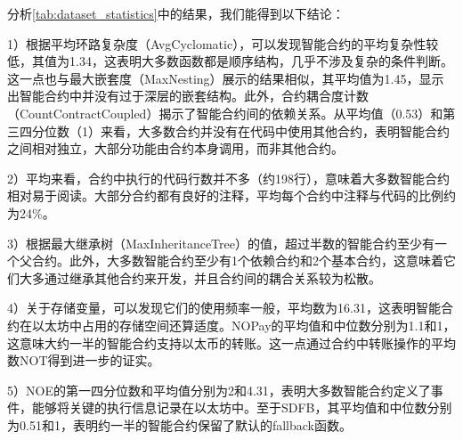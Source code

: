 分析\autoref{tab:dataset_statistics}中的结果，我们能得到以下结论：

1）根据平均环路复杂度（AvgCyclomatic），可以发现智能合约的平均复杂性较低，其值为1.34，这表明大多数函数都是顺序结构，几乎不涉及复杂的条件判断。这一点也与最大嵌套度（MaxNesting）展示的结果相似，其平均值为1.45，显示出智能合约中并没有过于深层的嵌套结构。此外，合约耦合度计数（CountContractCoupled）揭示了智能合约间的依赖关系。从平均值（0.53）和第三四分位数（1）来看，大多数合约并没有在代码中使用其他合约，表明智能合约之间相对独立，大部分功能由合约本身调用，而非其他合约。

2）平均来看，合约中执行的代码行数并不多（约198行），意味着大多数智能合约相对易于阅读。大部分合约都有良好的注释，平均每个合约中注释与代码的比例约为24\%。

3）根据最大继承树（MaxInheritanceTree）的值，超过半数的智能合约至少有一个父合约。此外，大多数智能合约至少有1个依赖合约和2个基本合约，这意味着它们大多通过继承其他合约来开发，并且合约间的耦合关系较为松散。

4）关于存储变量，可以发现它们的使用频率一般，平均数为16.31，这表明智能合约在以太坊中占用的存储空间还算适度。NOPay的平均值和中位数分别为1.1和1，这意味大约一半的智能合约支持以太币的转账。这一点通过合约中转账操作的平均数NOT得到进一步的证实。

5）NOE的第一四分位数和平均值分别为2和4.31，表明大多数智能合约定义了事件，能够将关键的执行信息记录在以太坊中。至于SDFB，其平均值和中位数分别为0.51和1，表明约一半的智能合约保留了默认的fallback函数。
